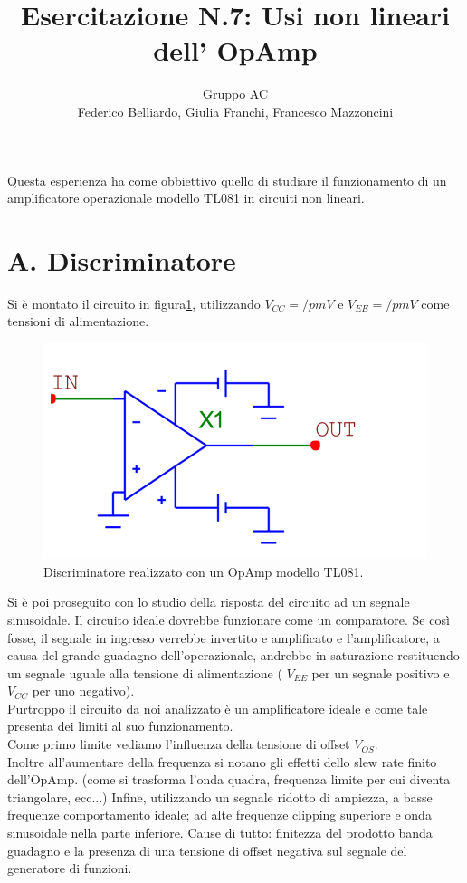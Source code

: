 \documentclass[10pt,a4paper]{article}
\author{Gruppo AC \\ Federico Belliardo, Giulia Franchi, Francesco Mazzoncini}
\title{Esercitazione N.7: Usi non lineari dell’ OpAmp}
\begin{document}
\maketitle
Questa esperienza ha come obbiettivo quello di studiare il funzionamento di un amplificatore operazionale modello TL081 in circuiti non lineari.

\section*{A. Discriminatore}

Si è montato il circuito in figura\ref{circuito1}, utilizzando $V_{CC} = /pm V$ e $V_{EE} = /pm V$ come tensioni di alimentazione.

\begin{figure}[h]
\centering
\includegraphics[scale=0.5]{Discriminatore.png}
\caption{Discriminatore realizzato con un OpAmp modello TL081.\label{circuito1}}
\end{figure}

Si è poi proseguito con lo studio della risposta del circuito ad un segnale sinusoidale. Il circuito ideale dovrebbe funzionare come un comparatore. Se così fosse, il segnale in ingresso verrebbe invertito e amplificato e l'amplificatore, a causa del grande guadagno dell'operazionale, andrebbe in saturazione restituendo un segnale uguale alla tensione di alimentazione ( $V_{EE}$ per un segnale positivo e $V_{CC}$ per uno negativo).\\
Purtroppo il circuito da noi analizzato è un amplificatore ideale e come tale presenta dei limiti al suo funzionamento.\\
Come primo limite vediamo l'influenza della tensione di offset $V_{OS}$.\\
Inoltre all'aumentare della frequenza si notano gli effetti dello slew rate finito dell'OpAmp. (come si trasforma l'onda quadra, frequenza limite per cui diventa triangolare, ecc...)
Infine, utilizzando un segnale ridotto di ampiezza, a basse frequenze comportamento ideale; ad alte frequenze clipping superiore e onda sinusoidale nella parte inferiore. Cause di tutto: finitezza del prodotto banda guadagno e la presenza di una tensione di offset negativa sul segnale del generatore di funzioni.\\
\end{document}
